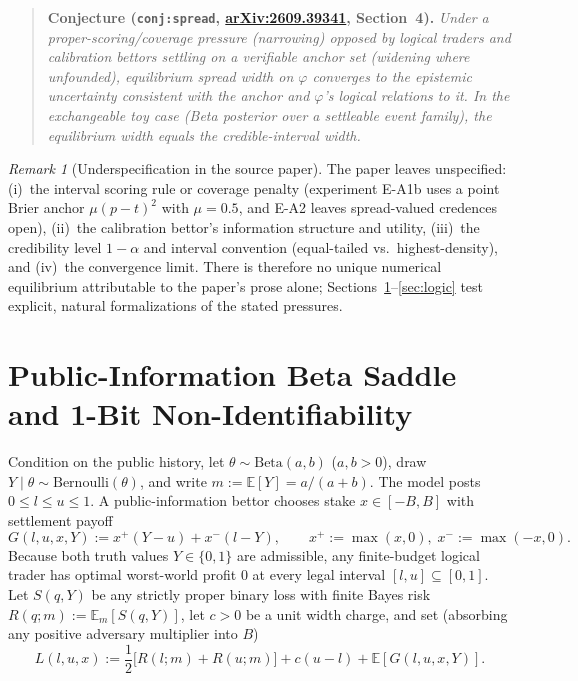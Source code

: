 \documentclass[11pt]{article}
\theoremstyle{plain}
\theoremstyle{definition}
\theoremstyle{remark}
\newtheorem{remark}{Remark}
\begin{document}
\begin{quote}
\textbf{Conjecture (\texttt{conj:spread}, \href{https://arxiv.org/abs/2609.39341}{arXiv:2609.39341}, Section~4).}
\emph{Under a proper-scoring/\allowbreak coverage pressure (narrowing) opposed by logical traders and calibration bettors \cite{foster1998} settling on a verifiable anchor set (widening where unfounded), equilibrium spread width on $\varphi$ converges to the epistemic uncertainty consistent with the anchor and $\varphi$'s logical relations to it. In the exchangeable toy case (Beta posterior over a settleable event family), the equilibrium width equals the credible-interval width.}
\end{quote}

\begin{remark}[Underspecification in the source paper]
The paper leaves unspecified: (i)~the interval scoring rule or coverage penalty (experiment E-A1b uses a point Brier anchor $\mu(p - t)^2$ with $\mu = 0.5$, and E-A2 leaves spread-valued credences open), (ii)~the calibration bettor's information structure and utility, (iii)~the credibility level $1-\alpha$ and interval convention (equal-tailed vs.\ highest-density), and (iv)~the convergence limit. There is therefore no unique numerical equilibrium attributable to the paper's prose alone; Sections~\ref{sec:public}--\ref{sec:logic} test explicit, natural formalizations of the stated pressures.
\end{remark}

\section{Public-Information Beta Saddle and 1-Bit Non-Identifiability}\label{sec:public}

Condition on the public history, let $\theta \sim \mathrm{Beta}(a, b)$ ($a, b > 0$), draw $Y \mid \theta \sim \mathrm{Bernoulli}(\theta)$, and write $m := \mathbb{E}[Y] = a/(a + b)$. The model posts $0 \le l \le u \le 1$. A public-information bettor chooses stake $x \in [-B, B]$ with settlement payoff
\[
G(l, u, x, Y) := x^+(Y - u) + x^-(l - Y), \qquad x^+ := \max(x, 0),\; x^- := \max(-x, 0).
\]
Because both truth values $Y \in \{0, 1\}$ are admissible, any finite-budget logical trader has optimal worst-world profit $0$ at every legal interval $[l, u] \subseteq [0, 1]$. Let $S(q, Y)$ be any strictly proper binary loss with finite Bayes risk $R(q; m) := \mathbb{E}_m[S(q, Y)]$, let $c > 0$ be a unit width charge, and set (absorbing any positive adversary multiplier into $B$)
\[
L(l, u, x) := \frac{1}{2}\bigl[R(l; m) + R(u; m)\bigr] + c(u - l) + \mathbb{E}[G(l, u, x, Y)].
\]
\end{document}
